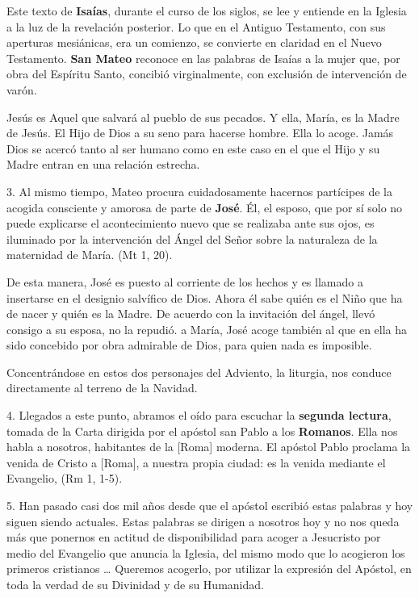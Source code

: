 \begin{body}
					Este texto de \textbf{Isaías}, durante el curso de los siglos, se lee y entiende en la Iglesia a la luz de la revelación posterior. Lo que en el Antiguo Testamento, con sus aperturas mesiánicas, era un comienzo, se convierte en claridad en el Nuevo Testamento. \textbf{San Mateo} reconoce en las palabras de Isaías a la mujer que, por obra del Espíritu Santo, concibió virginalmente, con exclusión de intervención de varón.
					
					Jesús es Aquel que salvará al pueblo de sus pecados. Y ella, María, es la Madre de Jesús. El Hijo de Dios  a su seno para hacerse hombre. Ella lo acoge. Jamás Dios se acercó tanto al ser humano como en este caso en el que el Hijo y su Madre entran en una relación estrecha.
					
					3. Al mismo tiempo, Mateo procura cuidadosamente hacernos partícipes de la acogida consciente y amorosa de parte de \textbf{José}. Él, el esposo, que por sí solo no puede explicarse el acontecimiento nuevo que se realizaba ante sus ojos, es iluminado por la intervención del Ángel del Señor sobre la naturaleza de la maternidad de María.  (Mt 1, 20).
					
					De esta manera, José es puesto al corriente de los hechos y es llamado a insertarse en el designio salvífico de Dios. Ahora él sabe quién es el Niño que ha de nacer y quién es la Madre. De acuerdo con la invitación del ángel, llevó consigo a su esposa, no la repudió.  a María, José acoge también al que en ella ha sido concebido por obra admirable de Dios, para quien nada es imposible.
					
					Concentrándose en estos dos personajes del Adviento, la liturgia, nos conduce directamente al terreno de la Navidad.
					
					4. Llegados a este punto, abramos el oído para escuchar la \textbf{segunda lectura}, tomada de la Carta dirigida por el apóstol san Pablo a los \textbf{Romanos}. Ella nos habla a nosotros, habitantes de la {[}Roma{]} moderna. El apóstol Pablo proclama la venida de Cristo a {[}Roma{]}, a nuestra propia ciudad: es la venida mediante el Evangelio,  (Rm 1, 1-5).
					
					5. Han pasado casi dos mil años desde que el apóstol escribió estas palabras y hoy siguen siendo actuales. Estas palabras se dirigen a nosotros hoy y no nos queda más que ponernos en actitud de disponibilidad para acoger a Jesucristo por medio del Evangelio que anuncia la Iglesia, del mismo modo que lo acogieron los primeros cristianos \ldots{} Queremos acogerlo, por utilizar la expresión del Apóstol, en toda la verdad de su Divinidad y de su Humanidad.
					

\end{body}
